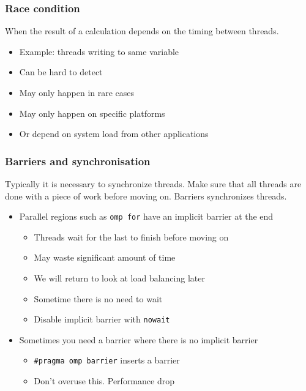 \subsubsection{Race condition}\label{race-condition}

When the result of a calculation depends on the timing between threads.

\begin{itemize}
\itemsep1pt\parskip0pt
\item
  Example: threads writing to same variable
\item
  Can be hard to detect
\item
  May only happen in rare cases
\item
  May only happen on specific platforms
\item
  Or depend on system load from other applications
\end{itemize}

\subsubsection{Barriers and
synchronisation}\label{barriers-and-synchronisation}

Typically it is necessary to synchronize threads. Make sure that all
threads are done with a piece of work before moving on. Barriers
synchronizes threads.

\begin{itemize}
\itemsep1pt\parskip0pt
\item
  Parallel regions such as \texttt{omp for} have an implicit barrier at
  the end

  \begin{itemize}
  \itemsep1pt\parskip0pt
  \item
    Threads wait for the last to finish before moving on
  \item
    May waste significant amount of time
  \item
    We will return to look at load balancing later
  \item
    Sometime there is no need to wait
  \item
    Disable implicit barrier with \texttt{nowait}
  \end{itemize}
\item
  Sometimes you need a barrier where there is no implicit barrier

  \begin{itemize}
  \itemsep1pt\parskip0pt
  \item
    \texttt{\#pragma omp barrier} inserts a barrier
  \item
    Don't overuse this. Performance drop
  \end{itemize}
\end{itemize}

